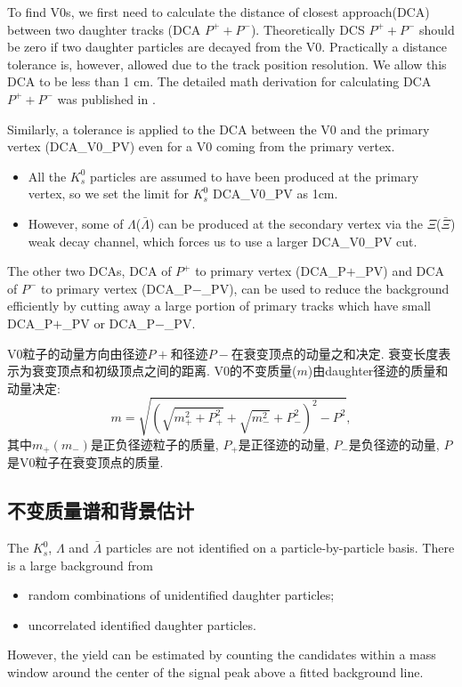 To find V0s, we first need to calculate the distance of closest approach(DCA) between two daughter tracks (DCA $P^{+} + P^{-}$). Theoretically DCS $P^{+} + P^{-}$ should be zero if two daughter particles are decayed from the V0.
Practically a distance tolerance is, however, allowed due to the track position resolution.
We allow this DCA to be less than 1 cm.
The detailed math derivation for calculating DCA $P^{+} + P^{-}$ was published in \cite{PhysRevLett.89.132301}.

Similarly, a tolerance is applied to the DCA between the V0 and the primary vertex (DCA\_V0\_PV) even for a V0 coming from the primary vertex.
\begin{itemize}
\item All the $K^{0}_{s}$ particles are assumed to have been produced at the primary vertex,
so we set the limit for $K^{0}_{s}$ DCA\_V0\_PV as 1cm.
\item {However, some of $\Lambda$($\bar{\Lambda}$)} can be produced at the secondary vertex via the $\Xi$($\bar{\Xi}$) weak decay channel, which forces us to use a larger DCA\_V0\_PV cut.
\end{itemize}

The other two DCAs, DCA of $P^{+}$ to primary vertex (DCA\_P$+$\_PV) and DCA of $P^{-}$ to primary vertex (DCA\_P$-$\_PV),
can be used to reduce the background efficiently by cutting away a large portion of primary tracks which have small DCA\_P$+$\_PV or DCA\_P$-$\_PV.

V0粒子的动量方向由径迹$P+$和径迹$P-$在衰变顶点的动量之和决定.
衰变长度表示为衰变顶点和初级顶点之间的距离.
V0的不变质量($m$)由daughter径迹的质量和动量决定:
\begin{equation}
  \label{eq:4}
  m = \sqrt{(\sqrt{m_{+}^{2} + P_{+}^{2}} + \sqrt{m_{-}^{2}} + P_{-}^{2})^{2} - P^{2}},
\end{equation}
其中$m_{+}(m_{-})$是正负径迹粒子的质量,
$P_{+}$是正径迹的动量,
$P_{-}$是负径迹的动量,
$P$是V0粒子在衰变顶点的质量.

\subsection{不变质量谱和背景估计}
The $K^{0}_{s}$, $\Lambda$ and $\bar{\Lambda}$ particles are not identified on a particle-by-particle basis.
There is a large background from
\begin{itemize}
\item{random combinations of unidentified daughter particles;}
\item{uncorrelated identified daughter particles.}
\end{itemize}
However, the yield can be estimated by counting the candidates within a mass window around the center of the signal peak above a fitted background line.
